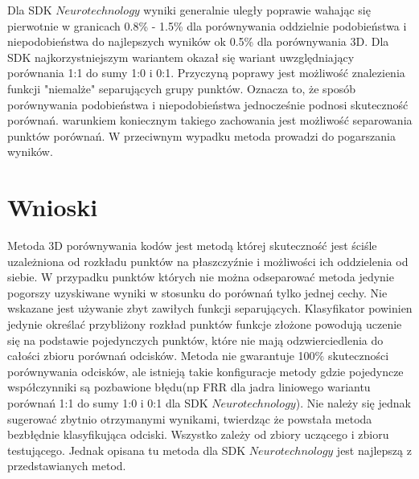     Dla SDK $Neurotechnology$ wyniki generalnie uległy poprawie wahając się pierwotnie w granicach 0.8\% - 1.5\% dla porównywania oddzielnie podobieństwa i niepodobieństwa do najlepszych wyników ok 0.5\% dla porównywania 3D. Dla SDK najkorzystniejszym wariantem okazał się wariant uwzględniający porównania 1:1 do sumy 1:0 i 0:1. Przyczyną poprawy jest możliwość znalezienia funkcji "niemalże" separujących grupy punktów. Oznacza to, że sposób porównywania podobieństwa i niepodobieństwa jednocześnie podnosi skuteczność porównań. warunkiem koniecznym takiego zachowania jest możliwość separowania punktów porównań. W przeciwnym wypadku metoda prowadzi do pogarszania wyników.
    
\section[Wnioski][Wnioski]{Wnioski}

Metoda 3D porównywania kodów jest metodą której skuteczność jest ściśle uzależniona od rozkładu punktów  na płaszczyźnie i możliwości ich oddzielenia od siebie. W przypadku punktów których nie można odseparować metoda jedynie pogorszy uzyskiwane wyniki w stosunku do porównań tylko jednej cechy. Nie wskazane jest używanie zbyt zawiłych funkcji separujących. Klasyfikator powinien jedynie określać przybliżony rozkład punktów funkcje złożone powodują uczenie się na podstawie pojedynczych punktów, które nie mają odzwierciedlenia do całości zbioru porównań odcisków. Metoda nie gwarantuje 100\% skuteczności porównywania odcisków, ale istnieją takie konfiguracje metody gdzie pojedyncze współczynniki są pozbawione błędu(np FRR dla jadra liniowego wariantu porównań 1:1 do sumy 1:0 i 0:1 dla SDK $Neurotechnology$). Nie należy się jednak sugerować zbytnio otrzymanymi wynikami, twierdząc że powstała metoda bezbłędnie klasyfikująca odciski. Wszystko zależy od zbiory uczącego i zbioru testującego. 
Jednak opisana tu metoda dla SDK $Neurotechnology$ jest najlepszą z przedstawianych metod. 
 
    